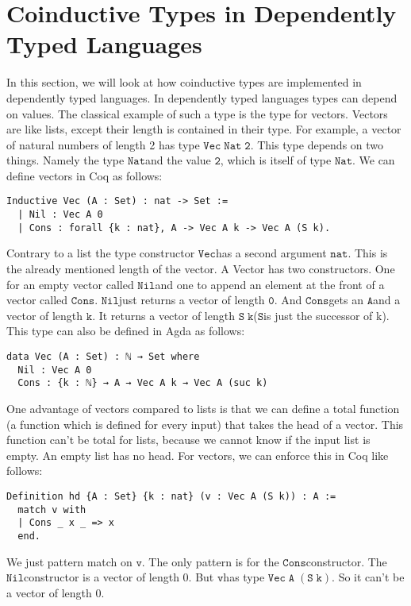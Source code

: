 \documentclass[a4paper,cleardoubleempty,BCOR1cm]{scrbook}
\begin{document}
\chapter{Coinductive Types in Dependently Typed Languages}
\label{sec:org8c9fb79}
In this section, we will look at how coinductive types are implemented in
dependently typed languages. In dependently typed languages types can depend on
values. The classical example of such a type is the type for vectors. Vectors are like
lists, except their length is contained in their type. For example, a vector of
natural numbers of length 2 has type $\mathtt{Vec\;Nat\;2}$. This type depends on two
things. Namely the type $\mathtt{Nat}$\;and the value $\mathtt{2}$, which is itself of type $\mathtt{Nat}$.
We can define vectors in Coq as follows:
\begin{verbatim}
Inductive Vec (A : Set) : nat -> Set :=
  | Nil : Vec A 0
  | Cons : forall {k : nat}, A -> Vec A k -> Vec A (S k).
\end{verbatim}
Contrary to a list the type constructor $\mathtt{Vec}$\;has a second argument $\mathtt{nat}$.
This is the already mentioned length of the vector. A Vector has two
constructors. One for an empty vector called $\mathtt{Nil}$\;and one to append an
element at the front of a vector called $\mathtt{Cons}$. $\mathtt{Nil}$\;just returns a vector
of length $\mathtt{0}$. And $\mathtt{Cons}$\;gets an $\mathtt{A}$\;and a vector of length $\mathtt{k}$. It returns a
vector of length $\mathtt{S\;k}$\;($\mathtt{S}$\;is just the successor of k). This type can also be
defined in Agda as follows:
\begin{verbatim}
data Vec (A : Set) : ℕ → Set where
  Nil : Vec A 0
  Cons : {k : ℕ} → A → Vec A k → Vec A (suc k)
\end{verbatim}
One advantage of vectors compared to lists is that we can define a total function
(a function which is defined for every input) that takes the head of a
vector. This function can't be total for lists, because we cannot know if the
input list is empty. An empty list has no head. For vectors, we can enforce this
in Coq like follows:
\begin{verbatim}
Definition hd {A : Set} {k : nat} (v : Vec A (S k)) : A :=
  match v with
  | Cons _ x _ => x
  end.
\end{verbatim}
We just pattern match on $\mathtt{v}$.  The only pattern is for the $\mathtt{Cons}$\;constructor.  The $\mathtt{Nil}$\;constructor
is a vector of length 0.  But $\mathtt{v}$\;has type $\mathtt{Vec\;A\;(S\;k)}$.  So it can't be a vector of length 0.
\end{document}

